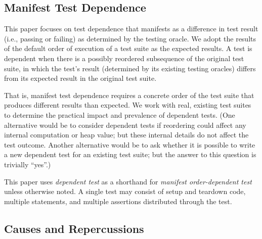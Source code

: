 
\subsection{Manifest Test Dependence}

This paper focuses on test
dependence that manifests as a
difference in test result (i.e., passing or failing) as determined by the testing oracle.
We adopt the results of the default
order of execution of a test suite as the
expected results. A test is dependent when there is a possibly
reordered subsequence of the original test suite, in which
the test's result (determined by its existing testing
oracles) differs from its expected result in the
original test suite.

That is, manifest test dependence
requires a concrete order of the test suite that
produces {different} results than expected.  
%
We work with real, existing test suites to determine the practical impact
and prevalence of dependent tests.
%
(One alternative would be to consider dependent tests if reordering could
affect any internal computation or heap value; but these internal details
do not affect the test outcome.  Another alternative would be to ask
whether it is possible to write a new dependent test for an existing
test suite; but the answer to this question is trivially ``yes''.)


This paper uses \textit{dependent test} as a shorthand for
\textit{manifest order-dependent test}
unless otherwise noted.
A single test may consist of setup and teardown
code, multiple statements, and multiple assertions
distributed through the test.




\subsection{Causes and Repercussions}
\label{sec:intro-repercussions}

